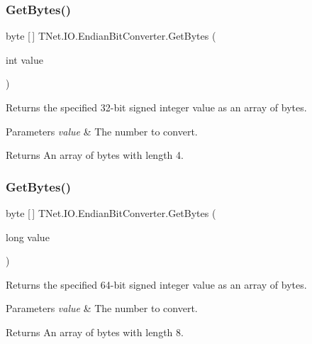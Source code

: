 \subsubsection{\texorpdfstring{Get\+Bytes()}{GetBytes()}\hspace{0.1cm}{\footnotesize\ttfamily [6/11]}}
{\footnotesize\ttfamily byte \mbox{[}$\,$\mbox{]} T\+Net.\+I\+O.\+Endian\+Bit\+Converter.\+Get\+Bytes (\begin{DoxyParamCaption}\item[{int}]{value }\end{DoxyParamCaption})}



Returns the specified 32-\/bit signed integer value as an array of bytes. 


\begin{DoxyParams}{Parameters}
{\em value} & The number to convert.\\
\hline
\end{DoxyParams}
\begin{DoxyReturn}{Returns}
An array of bytes with length 4.
\end{DoxyReturn}
\mbox{\label{class_t_net_1_1_i_o_1_1_endian_bit_converter_a3c9aae4ed4eb806f97a5b29dd47ad484}} 
\subsubsection{\texorpdfstring{Get\+Bytes()}{GetBytes()}\hspace{0.1cm}{\footnotesize\ttfamily [7/11]}}
{\footnotesize\ttfamily byte \mbox{[}$\,$\mbox{]} T\+Net.\+I\+O.\+Endian\+Bit\+Converter.\+Get\+Bytes (\begin{DoxyParamCaption}\item[{long}]{value }\end{DoxyParamCaption})}



Returns the specified 64-\/bit signed integer value as an array of bytes. 


\begin{DoxyParams}{Parameters}
{\em value} & The number to convert.\\
\hline
\end{DoxyParams}
\begin{DoxyReturn}{Returns}
An array of bytes with length 8.
\end{DoxyReturn}
\mbox{\label{class_t_net_1_1_i_o_1_1_endian_bit_converter_a473401216eb8158e500667635eb10e28}} 

